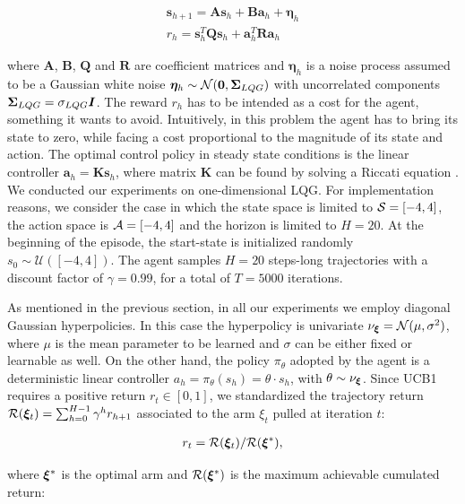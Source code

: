 \begin{align}
\boldsymbol{s}_{h+1}=\boldsymbol{A}\boldsymbol{s}_h+\boldsymbol{B}\boldsymbol{a}_h +\boldsymbol{\eta}_h\\
r_h=\boldsymbol{s}_{h}^T\boldsymbol{Q}\boldsymbol{s}_{h}+\boldsymbol{a}_{h}^T\boldsymbol{R}\boldsymbol{a}_{h}
\end{align}

where $\boldsymbol{A}$, $\boldsymbol{B}$, $\boldsymbol{Q}$ and $\boldsymbol{R}$ are coefficient matrices and $\boldsymbol{\eta}_h$ is a noise process assumed to be a Gaussian white noise $\boldsymbol{\eta}_h\sim\mathcal{N}(\boldsymbol{0}, \boldsymbol{\Sigma}_{LQG})$ with uncorrelated components $\boldsymbol{\Sigma}_{LQG}=\sigma_{LQG}\boldsymbol{I}$. The reward $r_h$ has to be intended as a cost for the agent, something it wants to avoid.
Intuitively, in this problem the agent has to bring its state to zero, while facing a cost proportional to the magnitude of its state and action. The optimal control policy in steady state conditions is the linear controller $\boldsymbol{a}_{h}=\boldsymbol{K}\boldsymbol{s}_{h}$, where matrix $\boldsymbol{K}$ can be found by solving a Riccati equation \cite{dorato1995linear}. We conducted our experiments on one-dimensional \gls{LQG}. 
For implementation reasons, we consider the case in which the state space is limited to $\mathcal{S}=[-4,4]$, the action space is $\mathcal{A}=[-4,4]$ and the horizon is limited to $H=20$. At the beginning of the episode, the start-state is initialized randomly $s_0\sim\mathcal{U}([-4,4])$. The agent samples $H=20$ steps-long trajectories with a discount factor of $\gamma=0.99$, for a total of $T=5000$ iterations.

As mentioned in the previous section, in all our experiments we employ diagonal Gaussian hyperpolicies. In this case the hyperpolicy is univariate $\nu_{\boldsymbol{\xi}} = \mathcal{N}(\mu, \sigma^2)$, where $\mu$ is the mean parameter to be learned and $\sigma$ can be either fixed or learnable as well. On the other hand, the policy $\pi_{\theta}$ adopted by the agent is a deterministic linear controller $a_h=\pi_{\theta}(s_h)=\theta\cdot s_h$, with $\theta\sim\nu_{\boldsymbol{\xi}}$. Since \gls{UCB}1 requires a positive return $r_t\in[0,1]$, we standardized the trajectory return $\mathcal{R}(\boldsymbol{\xi}_t)=\sum_{h=0}^{H-1}\gamma^h r_{h+1}$ associated to the arm $\xi_t$ pulled at iteration $t$: 

\begin{align}
r_t=\mathcal{R}(\boldsymbol{\xi}_t)/\mathcal{R}(\boldsymbol{\xi}^*),
\end{align}

where $\boldsymbol{\xi}^*$ is the optimal arm and $\mathcal{R}(\boldsymbol{\xi}^*)$ is the maximum achievable cumulated return:

